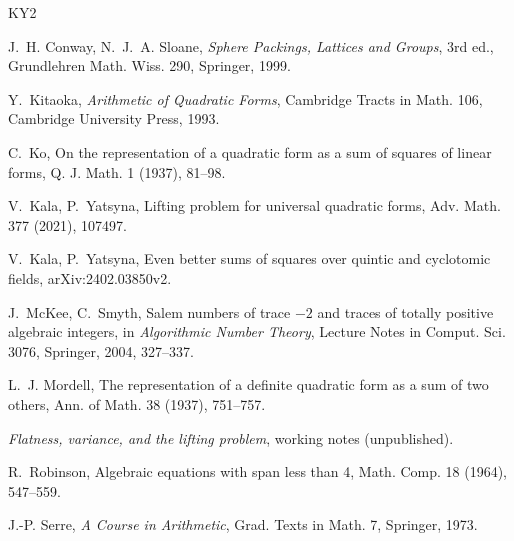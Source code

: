 \documentclass[11pt]{amsart}
\theoremstyle{definition}
\begin{document}
\begin{thebibliography}{KY2}

J.~H. Conway, N.~J.~A. Sloane,
\emph{Sphere Packings, Lattices and Groups}, 3rd ed., Grundlehren Math. Wiss. 290,
Springer, 1999.

Y.~Kitaoka, \emph{Arithmetic of Quadratic Forms}, Cambridge Tracts in Math. 106,
Cambridge University Press, 1993.

C.~Ko, On the representation of a quadratic form as a sum of squares of linear forms,
Q. J. Math. 1 (1937), 81--98.

V.~Kala, P.~Yatsyna, Lifting problem for universal quadratic forms,
Adv. Math. 377 (2021), 107497.

V.~Kala, P.~Yatsyna, Even better sums of squares over quintic and cyclotomic fields,
arXiv:2402.03850v2.

J.~McKee, C.~Smyth, Salem numbers of trace $-2$ and traces of totally positive algebraic
integers, in \emph{Algorithmic Number Theory}, Lecture Notes in Comput. Sci. 3076,
Springer, 2004, 327--337.

L.~J. Mordell, The representation of a definite quadratic form as a sum of two others,
Ann. of Math. 38 (1937), 751--757.

\emph{Flatness, variance, and the lifting problem}, working notes (unpublished).

R.~Robinson, Algebraic equations with span less than 4, Math. Comp. 18 (1964), 547--559.

J.-P. Serre, \emph{A Course in Arithmetic}, Grad. Texts in Math. 7, Springer, 1973.

\end{thebibliography}
\end{document}
